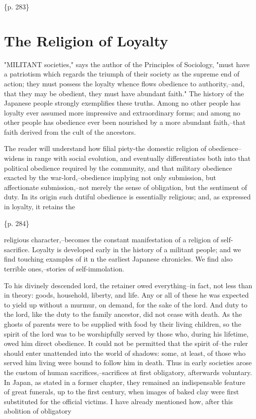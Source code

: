\{p. 283\}

\section{The Religion of Loyalty}
\label{sec:org283a1cc}

"MILITANT societies," says the author of the Principles of Sociology, "must have a patriotism which regards the triumph of their society as the supreme end of action; they must possess the loyalty whence flows obedience to authority,--and, that they may be obedient, they must have abundant faith." The history of the Japanese people strongly exemplifies these truths. Among no other people has loyalty ever assumed more impressive and extraordinary forms; and among no other people has obedience ever been nourished by a more abundant faith,--that faith derived from the cult of the ancestors.

The reader will understand how filial piety-the domestic religion of obedience--widens in range with social evolution, and eventually differentiates both into that political obedience required by the community, and that military obedience exacted by the war-lord,--obedience implying not only submission, but affectionate submission,--not merely the sense of obligation, but the sentiment of duty. In its origin such dutiful obedience is essentially religious; and, as expressed in loyalty, it retains the

\{p. 284\}

religious character,--becomes the constant manifestation of a religion of self-sacrifice. Loyalty is developed early in the history of a militant people; and we find touching examples of it n the earliest Japanese chronicles. We find also terrible ones,--stories of self-immolation.



To his divinely descended lord, the retainer owed everything--in fact, not less than in theory: goods, household, liberty, and life. Any or all of these he was expected to yield up without a murmur, on demand, for the sake of the lord. And duty to the lord, like the duty to the family ancestor, did not cease with death. As the ghosts of parents were to be supplied with food by their living children, so the spirit of the lord was to be worshipfully served by those who, during his lifetime, owed him direct obedience. It could not be permitted that the spirit of--the ruler should enter unattended into the world of shadows: some, at least, of those who served him living were bound to follow him in death. Thus in early societies arose the custom of human sacrifices,--sacrifices at first obligatory, afterwards voluntary. In Japan, as stated in a former chapter, they remained an indispensable feature of great funerals, up to the first century, when images of baked clay were first substituted for the official victims. I have already mentioned how, after this abolition of obligatory

